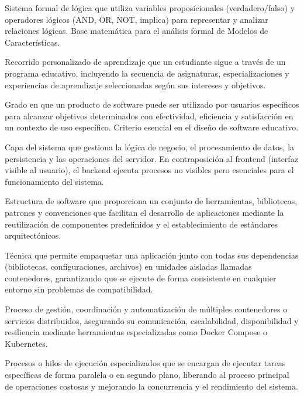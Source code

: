 \begin{description}[style=nextline,leftmargin=0pt]
    \item[Lógica Proposicional]
    Sistema formal de lógica que utiliza variables proposicionales (verdadero/falso) y operadores lógicos (AND, OR, NOT, implica) para representar y analizar relaciones lógicas. Base matemática para el análisis formal de Modelos de Características.
    
    \item[Trayectoria Formativa]
    Recorrido personalizado de aprendizaje que un estudiante sigue a través de un programa educativo, incluyendo la secuencia de asignaturas, especializaciones y experiencias de aprendizaje seleccionadas según sus intereses y objetivos.
    
    \item[Usabilidad]
    Grado en que un producto de software puede ser utilizado por usuarios específicos para alcanzar objetivos determinados con efectividad, eficiencia y satisfacción en un contexto de uso específico. Criterio esencial en el diseño de software educativo.
    
    \item[Backend]
    Capa del sistema que gestiona la lógica de negocio, el procesamiento de datos, la persistencia y las operaciones del servidor. En contraposición al frontend (interfaz visible al usuario), el backend ejecuta procesos no visibles pero esenciales para el funcionamiento del sistema.
    
    \item[Framework]
    Estructura de software que proporciona un conjunto de herramientas, bibliotecas, patrones y convenciones que facilitan el desarrollo de aplicaciones mediante la reutilización de componentes predefinidos y el establecimiento de estándares arquitectónicos.
    
    \item[Contenedorización]
    Técnica que permite empaquetar una aplicación junto con todas sus dependencias (bibliotecas, configuraciones, archivos) en unidades aisladas llamadas contenedores, garantizando que se ejecute de forma consistente en cualquier entorno sin problemas de compatibilidad.
    
    \item[Orquestación]
    Proceso de gestión, coordinación y automatización de múltiples contenedores o servicios distribuidos, asegurando su comunicación, escalabilidad, disponibilidad y resiliencia mediante herramientas especializadas como Docker Compose o Kubernetes.
    
    \item[Workers]
    Procesos o hilos de ejecución especializados que se encargan de ejecutar tareas específicas de forma paralela o en segundo plano, liberando al proceso principal de operaciones costosas y mejorando la concurrencia y el rendimiento del sistema.
    

\end{description}
